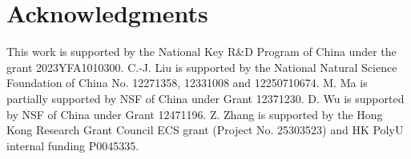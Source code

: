 \documentclass[reqno,11pt]{amsart}
\numberwithin{equation}{section}
\numberwithin{equation}{section}
\theoremstyle{plain}
\begin{document}
\section*{Acknowledgments}
This work is supported by the National Key R\&D Program of China under the grant 2023YFA1010300. C.-J. Liu is supported by the National
Natural Science Foundation of China No. 12271358, 12331008 and 12250710674. 
M. Ma is partially supported by NSF of China under Grant 12371230. D. Wu is supported by NSF of China under Grant 12471196.
Z. Zhang is supported by the Hong Kong Research Grant Council ECS grant (Project No. 25303523) and HK PolyU internal funding P0045335.



\end{document}
